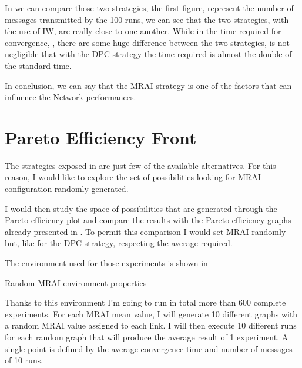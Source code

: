 In  we can compare those two strategies,
the first figure,  represent
the number of messages transmitted by the \num{100} runs, we can see that
the two strategies, with the use of \ac{IW}, are really close to one another.
While in the time required for convergence, ,
there are some huge difference between the two strategies, is not negligible
that with the \ac{DPC} strategy the time required is almost the double of the
standard time.

In conclusion, we can say that the \ac{MRAI} strategy is one of the factors that
can influence the Network performances.


\section{Pareto Efficiency Front}
\label{sec:bgp_mrai_pareto_front}

The strategies exposed in  are just few
of the available alternatives.
For this reason, I would like to explore the set of possibilities looking
for \ac{MRAI} configuration randomly generated.

I would then study the space of possibilities that are generated through the
Pareto efficiency plot and compare the results with the Pareto efficiency
graphs already presented in .
To permit this comparison I would set \ac{MRAI} randomly but, like for
the \ac{DPC} strategy, respecting the average required.

The environment used for those experiments is shown in 

\begin{table}[h]
	
	\caption{Random \ac{MRAI} environment properties}
	\label{tbl:random_env}
\end{table}

Thanks to this environment I'm going to run in total more than \num{600} complete
experiments.
For each \ac{MRAI} mean value, I will generate \num{10} different graphs with a random
\ac{MRAI} value assigned to each link.
I will then execute \num{10} different runs for each random graph that will produce
the average result of \num{1} experiment.
A single point is defined by the average convergence time and number of messages
of \num{10} runs.


